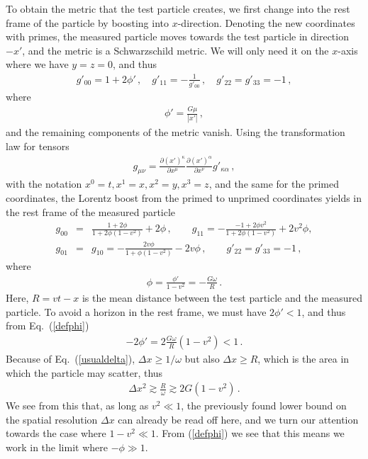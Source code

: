 \documentclass{article}
\def\beqn{\begin{eqnarray}}
\def\eeqn{\end{eqnarray}}
\begin{document}
To obtain the metric that the test particle creates, we first change into the rest 
frame of the particle by boosting into $x$-direction. Denoting the new coordinates with
primes, the measured
particle moves towards the test particle in direction $-x'$, and the metric 
is a Schwarzschild metric. We will only need it on the
$x$-axis where we have $y=z=0$, and thus
\beqn
g'_{00} = 1 + 2 \phi' \,, \quad 
g'_{11} = - \frac{1}{g'_{00}} \,, \quad 
g'_{22}=g'_{33} = -1 \,,
\eeqn
where
\beqn
\phi' = \frac{G\mu}{| x' |}\,,
\eeqn
and the remaining components of the metric vanish. Using the transformation law for tensors
\beqn
g_{\mu\nu} = \frac{\partial (x')^\kappa}{\partial x^\mu} \frac{\partial (x')^\alpha}{\partial x^\nu} g'_{\kappa \alpha} \,,
\eeqn
with the notation $x^0 = t, x^1 =x, x^2 =y, x^3 = z$, and the same for the primed coordinates,
the Lorentz boost from the primed to unprimed coordinates yields in the rest frame of the measured particle
\beqn
g_{00} &=& \frac{1 + 2 \phi}{1+ 2\phi(1-v^2)} + 2 \phi \,,\qquad g_{11} = - \frac{-1 + 2 \phi v^2}{1+2 \phi (1-v^2)} + 2 v^2 \phi ,\\
g_{01} &=& g_{10} = - \frac{2v\phi}{1+ \phi (1-v^2)} - 2 v \phi \,,\qquad g'_{22}=g'_{33} = -1 \,, \label{gphi}
\eeqn
where 
\beqn
\phi = \frac{\phi'}{1-v^2} = - \frac{G\omega}{R} \,. \label{defphi}
\eeqn
Here, $R=vt -x$ is the mean distance between the test particle and the measured particle.
To avoid a horizon in the rest frame, we must have $2\phi' <1$, and thus from Eq.~(\ref{defphi}) 
\beqn
- 2 \phi' = 2 \frac{G\omega}{R} (1-v^2) < 1 \,. \label{ineqphi}
\eeqn
Because of Eq.~(\ref{usualdelta}), $\Delta x \geq 1/\omega$ but also $\Delta x \geq R$, which
is the area in which the particle may scatter, thus 
\beqn
\Delta x^2 \gtrsim \frac{R}{\omega} \gtrsim 2 G (1 -v^2) \,.
\eeqn
We see from this that, as long as $v^2 \ll 1$,  the previously found lower bound on the spatial resolution $\Delta x$ can already
be read off here, and we turn our attention towards the case where $1- v^2 \ll 1$. From (\ref{defphi}) we see that
this means we work in the limit where $-\phi \gg 1$. 
\end{document}
